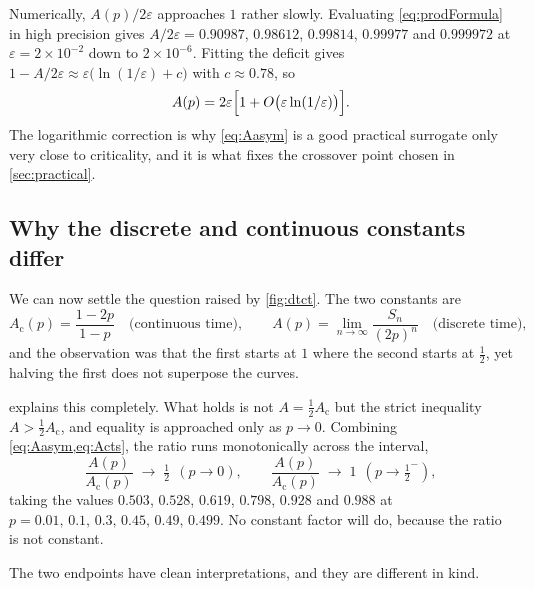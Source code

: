 \begin{remark}
\label{rem:rate}
Numerically, $A(p)/2\varepsilon$ approaches $1$ rather slowly. Evaluating
\cref{eq:prodFormula} in high precision gives $A/2\varepsilon = 0.90987$, $0.98612$,
$0.99814$, $0.99977$ and $0.999972$ at $\varepsilon = 2\times10^{-2}$ down to
$2\times10^{-6}$. Fitting the deficit gives
$1-A/2\varepsilon \approx \varepsilon\bigl(\ln(1/\varepsilon)+c\bigr)$ with
$c\approx0.78$, so
\begin{equation*}
A(p) = 2\varepsilon\Bigl[1+O\bigl(\varepsilon\ln(1/\varepsilon)\bigr)\Bigr] .
\end{equation*}
The logarithmic correction is why \cref{eq:Aasym} is a good practical surrogate only very
close to criticality, and it is what fixes the crossover point chosen in
\cref{sec:practical}.
\end{remark}

\subsection{Why the discrete and continuous constants differ}
\label{sec:compare}

We can now settle the question raised by \cref{fig:dtct}. The two constants are
\begin{equation*}
A_{\text{c}}(p) = \frac{1-2p}{1-p}
\quad\text{(continuous time)},
\qquad
A(p) = \lim_{n\to\infty}\frac{S_n}{(2p)^n}
\quad\text{(discrete time)},
\end{equation*}
and the observation was that the first starts at $1$ where the second starts at
$\tfrac12$, yet halving the first does not superpose the curves.

 explains this completely. What holds is not $A = \tfrac12A_{\text{c}}$
but the strict inequality $A>\tfrac12A_{\text{c}}$, and equality is approached only as
$p\to0$. Combining \cref{eq:Aasym,eq:Acts}, the ratio runs monotonically across the
interval,
\begin{equation}
\label{eq:ratiolimits}
\frac{A(p)}{A_{\text{c}}(p)} \;\longrightarrow\; \tfrac12 \ \ (p\to0),
\qquad
\frac{A(p)}{A_{\text{c}}(p)} \;\longrightarrow\; 1 \ \ (p\to\tfrac12^-),
\end{equation}
taking the values $0.503$, $0.528$, $0.619$, $0.798$, $0.928$ and $0.988$ at
$p=0.01,\,0.1,\,0.3,\,0.45,\,0.49,\,0.499$. No constant factor will do, because the ratio
is not constant.

The two endpoints have clean interpretations, and they are different in kind.

